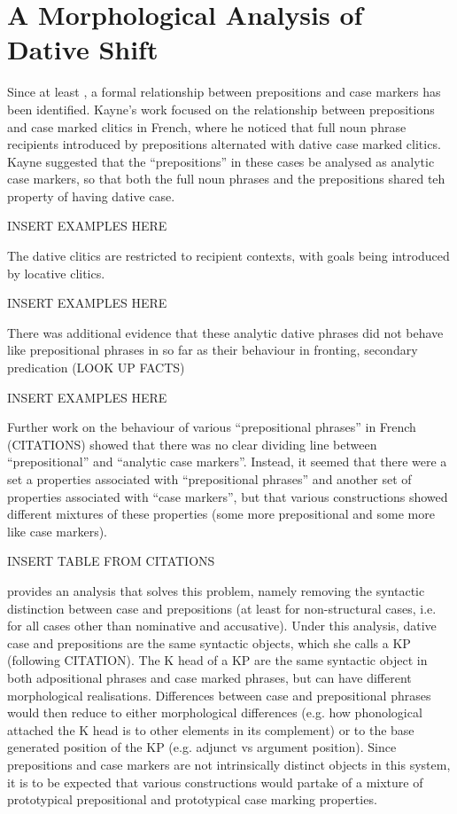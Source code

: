 \documentclass[11pt]{upenndiss}
\begin{document}
\chapter{A Morphological Analysis of Dative Shift}
Since at least \cite{Kayne.1975}, a formal relationship between prepositions and case markers has been identified. Kayne's work focused on the relationship between prepositions and case marked clitics in French, where he noticed that full noun phrase recipients introduced by prepositions alternated with dative case marked clitics. Kayne suggested that the ``prepositions'' in these cases be analysed as analytic case markers, so that both the full noun phrases and the prepositions shared teh property of having dative case.

INSERT EXAMPLES HERE

The dative clitics are restricted to recipient contexts, with goals being introduced by locative clitics.

INSERT EXAMPLES HERE

There was additional evidence that these analytic dative phrases did not behave like prepositional phrases in so far as their behaviour in fronting, secondary predication (LOOK UP FACTS)

INSERT EXAMPLES HERE

Further work on the behaviour of various ``prepositional phrases'' in French (CITATIONS) showed that there was no clear dividing line between ``prepositional'' and ``analytic case markers''. Instead, it seemed that there were a set a properties associated with ``prepositional phrases'' and another set of properties associated with ``case markers'', but that various constructions showed different mixtures of these properties (some more prepositional and some more like case markers).

INSERT TABLE FROM CITATIONS

\cite{Asbury.2007} provides an analysis that solves this problem, namely removing the syntactic distinction between case and prepositions (at least for non-structural cases, i.e. for all cases other than nominative and accusative). Under this analysis, dative case and prepositions are the same syntactic objects, which she calls a KP (following CITATION). The K head of a KP are the same syntactic object in both adpositional phrases and case marked phrases, but can have different morphological realisations. Differences between case and prepositional phrases would then reduce to either morphological differences (e.g. how phonological attached the K head is to other elements in its complement) or to the base generated position of the KP (e.g. adjunct vs argument position). Since prepositions and case markers are not intrinsically distinct objects in this system, it is to be expected that various constructions would partake of a mixture of prototypical prepositional and prototypical case marking properties.
\end{document}
